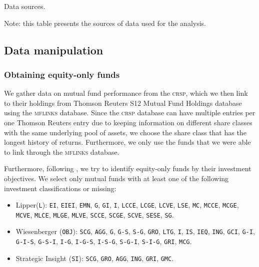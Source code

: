 \documentclass[12pt, a4]{article}
\begin{document}
\begin{table}[h!]
    \centering
    \begin{threeparttable}
    \caption{Data sources.}
    \label{tab:data-sources}
    
    

    \begin{tablenotes}
		\scriptsize
		\item Note: this table presents the sources of data used for the analysis. 
    \end{tablenotes}
    \end{threeparttable}
    
\end{table}

\subsection*{Data manipulation}\label{sec:data-manipulation}
\subsubsection*{Obtaining equity-only funds}\label{sec:equity-only}
We gather data on mutual fund performance from the \textsc{crsp}, which we then link to their holdings from Thomson Reuters S12 Mutual Fund Holdings database using the \textsc{mflinks} database. Since the \textsc{crsp} database can have multiple entries per one Thomson Reuters entry due to keeping information on different share classes with the same underlying pool of assets, we choose the share class that has the longest history of returns. Furthermore, we only use the funds that we were able to link through the \textsc{mflinks} database.

Furthermore, following \cite{verbeek}, we try to identify equity-only funds by their investment objectives. We select only mutual funds with at least one of the following investment classifications or missing:

\begin{itemize}
    \item Lipper(\texttt{L}): \texttt{EI}, \texttt{EIEI}, \texttt{EMN}, \texttt{G}, \texttt{GI}, \texttt{I}, \texttt{LCCE}, \texttt{LCGE}, \texttt{LCVE}, \texttt{LSE}, \texttt{MC}, \texttt{MCCE}, \texttt{MCGE}, \texttt{MCVE}, \texttt{MLCE}, \texttt{MLGE}, \texttt{MLVE}, \texttt{SCCE}, \texttt{SCGE}, \texttt{SCVE}, \texttt{SESE}, \texttt{SG}.
    \item Wiesenberger (\texttt{OBJ}): \texttt{SCG}, \texttt{AGG}, \texttt{G}, \texttt{G-S}, \texttt{S-G}, \texttt{GRO}, \texttt{LTG}, \texttt{I}, \texttt{IS}, \texttt{IEQ}, \texttt{ING}, \texttt{GCI}, \texttt{G-I}, \texttt{G-I-S}, \texttt{G-S-I}, \texttt{I-G}, \texttt{I-G-S}, \texttt{I-S-G}, \texttt{S-G-I}, \texttt{S-I-G}, \texttt{GRI}, \texttt{MCG}.
    \item Strategic Insight (\texttt{SI}): \texttt{SCG}, \texttt{GRO}, \texttt{AGG}, \texttt{ING}, \texttt{GRI}, \texttt{GMC}.
\end{itemize}
\end{document}
